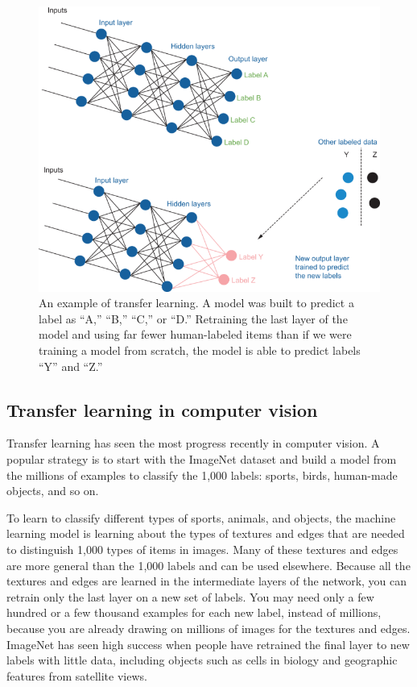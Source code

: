 \documentclass[sigconf,nonacm,screen,pbalance]{acmart}
\begin{document}
\begin{figure}[ht]
\centering
\vspace{-5pt}
\includegraphics[width=\columnwidth]{CH01_F04_Munro.png}
\vspace{-20pt}
\caption{An example of transfer learning. A model was built to predict a label as ``A,'' ``B,''
``C,'' or ``D.'' Retraining the last layer of the model and using far fewer human-labeled
items than if we were training a model from scratch, the model is able to predict labels
``Y'' and ``Z.''}
\vspace{-15pt}
\label{fig:f4}
\end{figure}

\subsection{Transfer learning in computer vision}
Transfer
learning
has seen the most progress recently in computer vision. A popular strategy is to start
with the ImageNet dataset and build a model from the millions of examples to classify
the 1,000 labels: sports, birds, human-made objects, and so on.

To
learn to classify different types of sports, animals, and objects, the machine learning
model is learning about the types of textures and edges that are needed to distinguish
1,000 types of items in images. Many of these textures and edges are more general than
the 1,000 labels and can be used elsewhere. Because all the textures and edges are
learned in the intermediate layers of the network, you can retrain only the last layer
on a new set of labels. You may need only a few hundred or a few thousand examples for
each new label, instead of millions, because you are already drawing on millions of
images for the textures and edges. ImageNet has seen high success when people have
retrained the final layer to new labels with little data, including objects such as
cells in biology and geographic features from satellite views.
\end{document}

